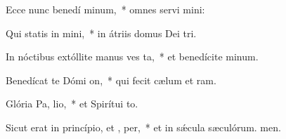 \item Ecce nunc benedí minum,~* omnes servi mini:
\item Qui statis in  mini,~* in átriis domus Dei tri.
\item In nóctibus extóllite manus ves  ta,~* et benedícite minum.
\item Benedícat te Dómi  on,~* qui fecit cælum et ram.
\item Glória Pa,  lio,~* et Spirítui to.
\item Sicut erat in princípio, et ,  per,~* et in sǽcula sæculórum. men.
